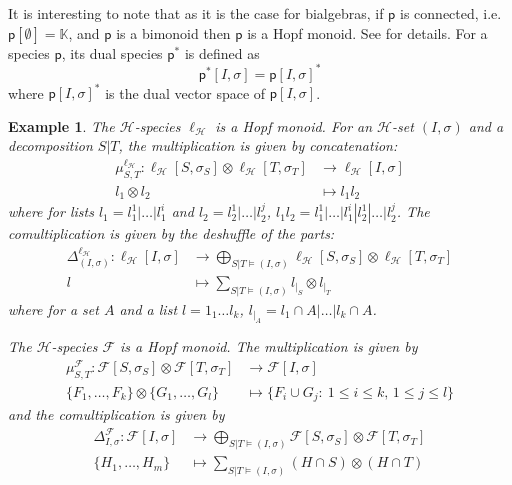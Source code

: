 \documentclass[11pt,reqno]{amsart}
\numberwithin{equation}{section}
\newtheorem{ex}[theorem]{Example}
\def\K{{\mathbb K}}
\def\H{{\mathcal{H}}}
\def\p{{\textsf{p}}}
\def\lB{\ell_{\H}}
\def\F{\mathcal{F}}
\def\Is{(I,\sigma )}
\begin{document}
It is interesting to note that as it is the case for bialgebras, if $\p$ is connected, i.e. $\p[\emptyset]=\K$, and $\p$ is a bimonoid then $\p$ is a Hopf monoid. See \cite{Aguiar} for details. For a species $\p$, its dual species $\p^{\ast}$ is defined as
$$\p^{\ast}[I,\sigma]=\p[I,\sigma]^{\ast}$$
where $\p[I,\sigma]^{\ast}$ is the dual vector space of $\p[I,\sigma]$.

\begin{ex}
The $\H$-species $\lB$ is a Hopf monoid. For an $\H$-set $(I,\sigma)$ and a decomposition $S|T$, the multiplication is given by concatenation:
\begin{equation}
\begin{aligned}
\mu^{\lB}_{S,T}\colon \lB[S,\sigma_S]\otimes\lB[T,\sigma_T] &\rightarrow \lB[I,\sigma]\\
l_1\otimes l_2 &\mapsto l_1l_2
\end{aligned}
\end{equation}
where for lists $l_1=l^1_1|\dots |l^i_1$ and $l_2=l^1_2|\dots|l_2^j$, $l_1l_2=l^1_1|\dots |l^i_1|l^1_2|\dots|l_2^j$. The comultiplication is given by the deshuffle of the parts: 
\begin{equation}
\begin{aligned}
\Delta^{\lB}_{(I,\sigma)} \colon \lB[I,\sigma] &\rightarrow \bigoplus_{S|T\models (I,\sigma)} \lB[S,\sigma_S]\otimes\lB[T,\sigma_T] \\
l &\mapsto \sum_{S|T\models \Is} l_{|_S}\otimes l_{|_T}
\end{aligned}
\end{equation}
where for a set $A$ and a list $l=1_1\dots l_k$, $l_{|_A}=l_1\cap A | \dots | l_k\cap A$.

The $\H$-species $\F$ is a Hopf monoid. The multiplication is given by
\begin{equation}
\begin{aligned}
\mu^{\F}_{S,T}\colon \F[S,\sigma_S]\otimes \F[T,\sigma_T] & \rightarrow \F[I,\sigma]\\
\{F_1,\dots,F_k\}\otimes \{G_1,\dots,G_l\} &\mapsto \{F_i\cup G_j:\: 1\leq i\leq k,\, 1\leq j\leq l\}
\end{aligned}
\end{equation}
and the comultiplication is given by
\begin{equation}
\begin{aligned}
\Delta^{\F}_{I,\sigma} \colon \F[I,\sigma] &\rightarrow \bigoplus_{S|T\models (I,\sigma)} \F[S,\sigma_S]\otimes \F[T,\sigma_T]\\
\{H_1,\dots, H_m\} &\mapsto \sum_{S|T\models (I,\sigma)} (H\cap S)\otimes (H\cap T)
\end{aligned}
\end{equation}


\end{ex}
\end{document}
